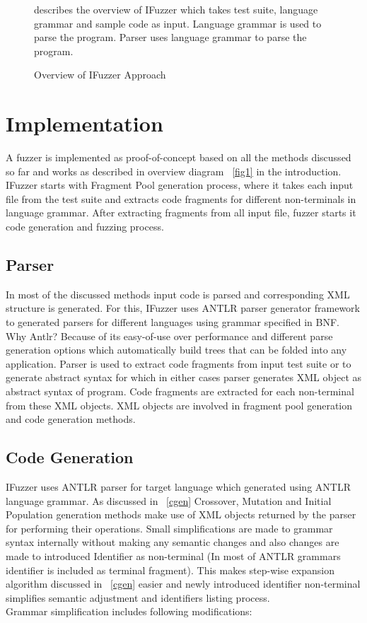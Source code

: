 \documentclass{acm_proc_article-sp}
\begin{document}
\begin{figure*}
\centering
{}
\caption {Overview of IFuzzer Approach}
\medskip
 describes the overview of IFuzzer which takes test suite, language grammar and sample code as input. Language grammar is used to parse the program. Parser uses language grammar to parse the program. 
\label{fig4}
\end{figure*}

\section{Implementation} \label{impl}
A fuzzer is implemented as proof-of-concept based on all the methods discussed so far and works as described in overview diagram ~\autoref{fig1} in the introduction. IFuzzer starts with Fragment Pool generation process, where it takes each input file from the test suite and extracts code fragments for different non-terminals in language grammar.
After extracting fragments from all input file, fuzzer starts it code generation and fuzzing process. 

\subsection{Parser}
In most of the discussed methods input code is parsed and corresponding XML structure is generated. For this, IFuzzer uses ANTLR parser generator framework \cite{Parr13} to generated parsers for different languages using grammar specified in BNF. Why Antlr? Because of its easy-of-use over performance and different parse generation options which automatically build trees that can be folded into any application. Parser is used to extract code fragments from input test suite or to generate abstract syntax for which in either cases parser generates XML object as abstract syntax of program. Code fragments are extracted for each non-terminal from these XML objects. XML objects are involved in fragment pool generation and code generation methods.

\subsection{Code Generation}
IFuzzer uses ANTLR parser for target language which generated using ANTLR language grammar. As discussed in ~\autoref{cgen} Crossover, Mutation and Initial Population generation methods make use of XML objects returned by the parser for performing their operations. Small simplifications are made to grammar syntax internally without making any semantic changes and also changes are made to introduced Identifier as non-terminal (In most of ANTLR grammars identifier is included as terminal fragment). This makes step-wise expansion algorithm discussed in ~\autoref{cgen} easier and newly introduced identifier non-terminal simplifies semantic adjustment and identifiers listing process. \\
Grammar simplification includes following modifications:
\end{document}
